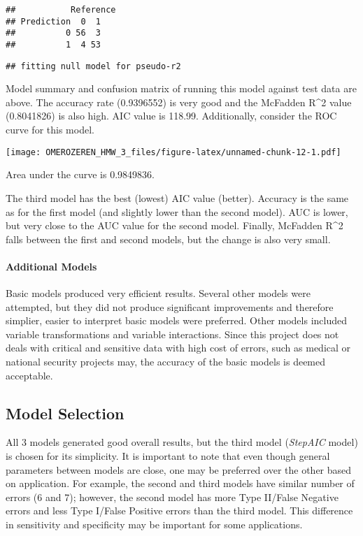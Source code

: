 \documentclass[]{article}
\let\oldparagraph\paragraph
\renewcommand{\paragraph}[1]{\oldparagraph{#1}\mbox{}}
\begin{document}
\begin{verbatim}
##           Reference
## Prediction  0  1
##          0 56  3
##          1  4 53
\end{verbatim}

\begin{verbatim}
## fitting null model for pseudo-r2
\end{verbatim}

Model summary and confusion matrix of running this model against test
data are above. The accuracy rate (0.9396552) is very good and the
McFadden R\^{}2 value (0.8041826) is also high. AIC value is 118.99.
Additionally, consider the ROC curve for this model.

\texttt{[image: OMEROZEREN\_HMW\_3\_files/figure-latex/unnamed-chunk-12-1.pdf]}

Area under the curve is 0.9849836.

The third model has the best (lowest) AIC value (better). Accuracy is
the same as for the first model (and slightly lower than the second
model). AUC is lower, but very close to the AUC value for the second
model. Finally, McFadden R\^{}2 falls between the first and second
models, but the change is also very small.

\hypertarget{additional-models}{%
\paragraph{Additional Models}\label{additional-models}}

Basic models produced very efficient results. Several other models were
attempted, but they did not produce significant improvements and
therefore simplier, easier to interpret basic models were preferred.
Other models included variable transformations and variable
interactions. Since this project does not deals with critical and
sensitive data with high cost of errors, such as medical or national
security projects may, the accuracy of the basic models is deemed
acceptable.

\hypertarget{model-selection}{%
\subsection{Model Selection}\label{model-selection}}

All 3 models generated good overall results, but the third model
(\emph{StepAIC} model) is chosen for its simplicity. It is important to
note that even though general parameters between models are close, one
may be preferred over the other based on application. For example, the
second and third models have similar number of errors (6 and 7);
however, the second model has more Type II/False Negative errors and
less Type I/False Positive errors than the third model. This difference
in sensitivity and specificity may be important for some applications.
\end{document}
